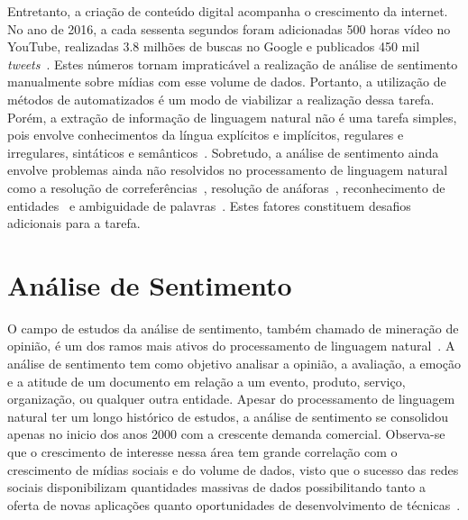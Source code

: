 Entretanto, a criação de conteúdo digital acompanha o crescimento da internet.
No ano de 2016, a cada sessenta segundos foram adicionadas 500 horas vídeo no YouTube, realizadas 3.8 milhões de buscas
no Google e publicados 450 mil \textit{tweets}~\cite{smartinsights}.
Estes números tornam impraticável a realização de análise de sentimento manualmente sobre mídias com esse volume de
dados.
Portanto, a utilização de métodos de automatizados é um modo de viabilizar a realização dessa tarefa.
Porém, a extração de informação de linguagem natural não é uma tarefa simples, pois envolve conhecimentos da língua
explícitos e implícitos, regulares e irregulares, sintáticos e semânticos~\cite{cambria13}.
Sobretudo, a análise de sentimento ainda envolve problemas ainda não resolvidos no processamento de linguagem
natural~\cite{cambria13}
como a resolução de correferências~\cite{soon01}, resolução de anáforas~\cite{lappin94}, reconhecimento de
entidades~\cite{nadeau07} e ambiguidade de palavras~\cite{yarowsky95}.
Estes fatores constituem desafios adicionais para a tarefa.

\section{Análise de Sentimento}

O campo de estudos da análise de sentimento, também chamado de mineração de opinião, é um dos ramos mais ativos do
processamento de linguagem natural~\cite{liu12}.
A análise de sentimento tem como objetivo analisar a opinião, a avaliação, a emoção e a atitude de um documento em
relação a um evento, produto, serviço, organização, ou qualquer outra entidade.
Apesar do processamento de linguagem natural ter um longo histórico de estudos, a análise de sentimento se consolidou
apenas no inicio dos anos 2000 com a crescente demanda comercial.
Observa-se que o crescimento de interesse nessa área tem grande correlação com o crescimento de mídias sociais e do
volume de dados, visto que o sucesso das redes sociais disponibilizam quantidades massivas de dados possibilitando tanto
a oferta de novas aplicações quanto oportunidades de desenvolvimento de técnicas~\cite{liu12}.

